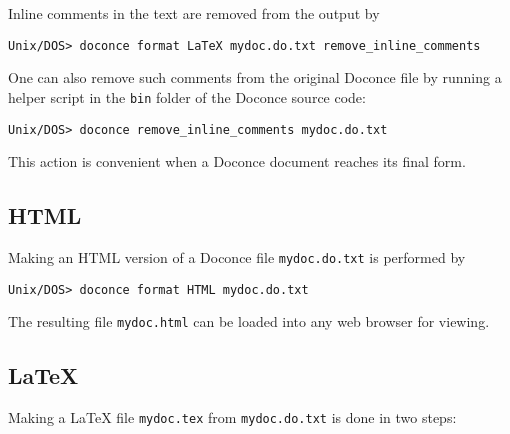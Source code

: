\documentclass{article}
\begin{document}
Inline comments in the text are removed from the output by
\vspace{4pt}
\begin{Verbatim}[numbers=none,frame=lines,label=\fbox{{\tiny Terminal}},fontsize=\fontsize{9pt}{9pt},
labelposition=topline,framesep=2.5mm,framerule=0.7pt]
Unix/DOS> doconce format LaTeX mydoc.do.txt remove_inline_comments
\end{Verbatim}
One can also remove such comments from the original Doconce file
by running a helper script in the {\fontsize{10pt}{10pt}\verb!bin!} folder of the Doconce
source code:
\begin{Verbatim}[fontsize=\fontsize{9pt}{9pt},tabsize=8,baselinestretch=0.85,
fontfamily=tt,xleftmargin=7mm]
Unix/DOS> doconce remove_inline_comments mydoc.do.txt
\end{Verbatim}
\noindent
This action is convenient when a Doconce document reaches its final form.

\subsection{HTML}

Making an HTML version of a Doconce file {\fontsize{10pt}{10pt}\verb!mydoc.do.txt!}
is performed by
\vspace{4pt}
\begin{Verbatim}[numbers=none,frame=lines,label=\fbox{{\tiny Terminal}},fontsize=\fontsize{9pt}{9pt},
labelposition=topline,framesep=2.5mm,framerule=0.7pt]
Unix/DOS> doconce format HTML mydoc.do.txt
\end{Verbatim}
The resulting file {\fontsize{10pt}{10pt}\verb!mydoc.html!} can be loaded into any web browser for viewing.

\subsection{{\LaTeX}}

Making a {\LaTeX} file {\fontsize{10pt}{10pt}\verb!mydoc.tex!} from {\fontsize{10pt}{10pt}\verb!mydoc.do.txt!} is done in two steps:
\end{document}
